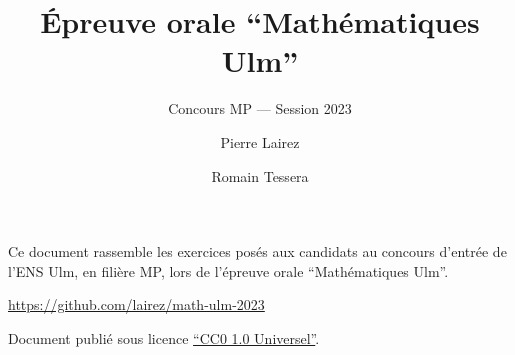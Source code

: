 \documentclass[a4paper,parskip=half-,headings=small]{scrartcl}
\title{Épreuve orale “Mathématiques Ulm”}
\subtitle{Concours MP --- Session 2023}
\author{Pierre Lairez \and Romain Tessera}
\date{}
\begin{document}
\maketitle
\begin{center}
  \begin{minipage}{.7\linewidth}
    \footnotesize\sffamily
    Ce document rassemble les exercices posés aux candidats au concours d'entrée de l'ENS Ulm, en filière MP, lors de l'épreuve orale “Mathématiques Ulm”.
    \bigskip

    \faGithub{} \url{https://github.com/lairez/math-ulm-2023}

    \bigskip
    Document publié sous licence \href{https://creativecommons.org/publicdomain/zero/1.0/deed.fr}{``CC0 1.0 Universel''}.
  \end{minipage}
\end{center}





























\printbibliography
\end{document}
